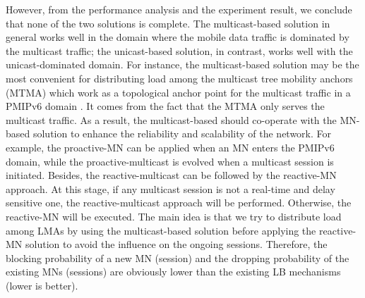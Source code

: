 However, from the performance analysis and the experiment result, we conclude that none of the two solutions is complete. The multicast-based solution in general works well in the domain where the mobile data traffic is dominated by the multicast traffic; the unicast-based solution, in contrast, works well with the unicast-dominated domain. For instance, the multicast-based solution may be the most convenient for distributing load among the multicast tree mobility anchors (MTMA) which work as a topological anchor point for the multicast traffic in a PMIPv6 domain \cite{ro_pmip}. It comes from the fact that the MTMA only serves the multicast traffic. As a result, the multicast-based should co-operate with the MN-based solution to enhance the reliability and scalability of  the network. For example, the proactive-MN can be applied when an MN enters the PMIPv6 domain, while the proactive-multicast is evolved when a multicast session is initiated. Besides, the reactive-multicast can be followed by the reactive-MN approach. At this stage, if any multicast session is not a real-time and delay sensitive one, the reactive-multicast approach will be performed. Otherwise, the reactive-MN will be executed. The main idea is that we try to distribute load among LMAs by using the multicast-based solution before applying the reactive-MN solution to avoid the influence on the ongoing sessions. Therefore, the blocking probability of a new MN (session) and the dropping probability of the existing MNs (sessions) are obviously lower than the existing LB mechanisms (lower is better).




